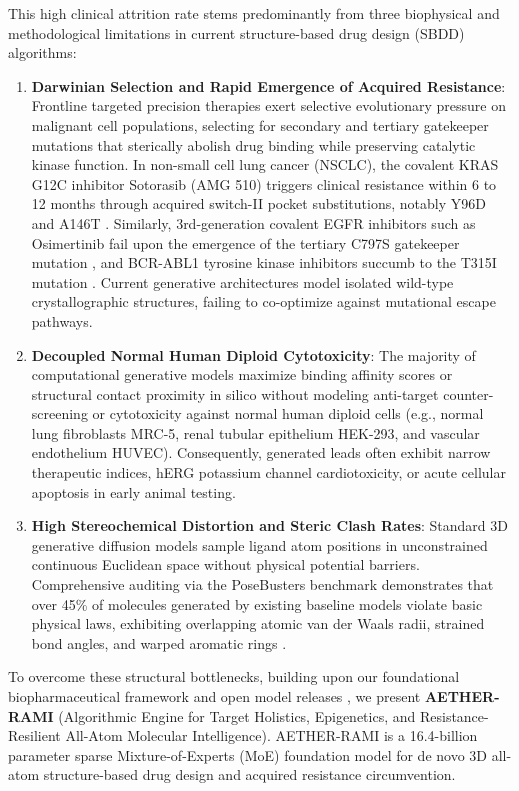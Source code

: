 This high clinical attrition rate stems predominantly from three biophysical and methodological limitations in current structure-based drug design (SBDD) algorithms:
\begin{enumerate}
    \item \textbf{Darwinian Selection and Rapid Emergence of Acquired Resistance}: Frontline targeted precision therapies exert selective evolutionary pressure on malignant cell populations, selecting for secondary and tertiary gatekeeper mutations that sterically abolish drug binding while preserving catalytic kinase function. In non-small cell lung cancer (NSCLC), the covalent KRAS G12C inhibitor Sotorasib (AMG 510) \cite{canon2019clinical} triggers clinical resistance within 6 to 12 months through acquired switch-II pocket substitutions, notably Y96D and A146T \cite{tanaka2021clinical}. Similarly, 3rd-generation covalent EGFR inhibitors such as Osimertinib fail upon the emergence of the tertiary C797S gatekeeper mutation \cite{thress2015acquired}, and BCR-ABL1 tyrosine kinase inhibitors succumb to the T315I mutation \cite{shah2004overriding}. Current generative architectures model isolated wild-type crystallographic structures, failing to co-optimize against mutational escape pathways.
    \item \textbf{Decoupled Normal Human Diploid Cytotoxicity}: The majority of computational generative models maximize binding affinity scores or structural contact proximity in silico without modeling anti-target counter-screening or cytotoxicity against normal human diploid cells (e.g., normal lung fibroblasts MRC-5, renal tubular epithelium HEK-293, and vascular endothelium HUVEC). Consequently, generated leads often exhibit narrow therapeutic indices, hERG potassium channel cardiotoxicity, or acute cellular apoptosis in early animal testing.
    \item \textbf{High Stereochemical Distortion and Steric Clash Rates}: Standard 3D generative diffusion models sample ligand atom positions in unconstrained continuous Euclidean space without physical potential barriers. Comprehensive auditing via the PoseBusters benchmark demonstrates that over 45\% of molecules generated by existing baseline models violate basic physical laws, exhibiting overlapping atomic van der Waals radii, strained bond angles, and warped aromatic rings \cite{van2023posebusters}.
\end{enumerate}

To overcome these structural bottlenecks, building upon our foundational biopharmaceutical framework \cite{yadav2026aether} and open model releases \cite{yadav2026model,yadav2026space,yadav2026code}, we present \textbf{AETHER-RAMI} (Algorithmic Engine for Target Holistics, Epigenetics, and Resistance-Resilient All-Atom Molecular Intelligence). AETHER-RAMI is a 16.4-billion parameter sparse Mixture-of-Experts (MoE) foundation model for de novo 3D all-atom structure-based drug design and acquired resistance circumvention.

